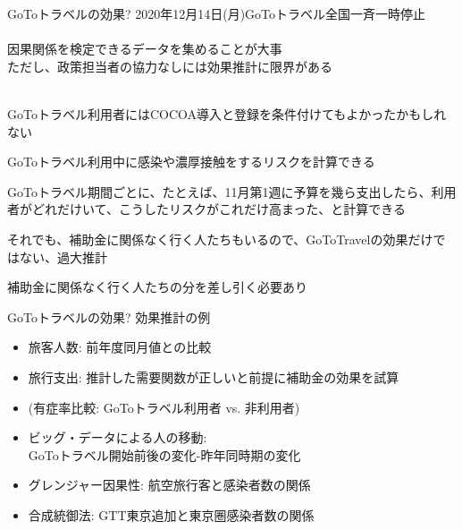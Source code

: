 \begin{frame}[t]{GoToトラベルの効果?}
2020年12月14日(月)GoToトラベル全国一斉一時停止\\~\\
因果関係を検定できるデータを集めることが大事\\
\pause
ただし、政策担当者の協力なしには効果推計に限界がある\\~\\
\pause
\begin{dinglist}{43}
\vspace{1.0ex}\setlength{\itemsep}{1.0ex}\setlength{\baselineskip}{12pt}
\item	GoToトラベル利用者にはCOCOA導入と登録を条件付けてもよかったかもしれない
\item	GoToトラベル利用中に感染や濃厚接触をするリスクを計算できる
\item	GoToトラベル期間ごとに、たとえば、11月第1週に予算を幾ら支出したら、利用者がどれだけいて、こうしたリスクがこれだけ高まった、と計算できる
	\begin{dinglist}{45}
	\vspace{1.0ex}\setlength{\itemsep}{1.0ex}\setlength{\baselineskip}{12pt}
	\item	それでも、補助金に関係なく行く人たちもいるので、GoToTravelの効果だけではない、過大推計
	\item	補助金に関係なく行く人たちの分を差し引く必要あり
	\end{dinglist}
\end{dinglist}
\end{frame}

\begin{frame}[t]{GoToトラベルの効果?}
効果推計の例
\begin{itemize}
\vspace{1.0ex}\setlength{\itemsep}{2.0ex}\setlength{\baselineskip}{12pt}
\item	旅客人数: 前年度同月値との比較
\item	旅行支出: 推計した需要関数が正しいと前提に補助金の効果を試算
\item	(有症率比較: GoToトラベル利用者 vs. 非利用者)
\item	ビッグ・データによる人の移動: \\
\hspace{1em}GoToトラベル開始前後の変化-昨年同時期の変化
\item	グレンジャー因果性: 航空旅行客と感染者数の関係
\item	合成統御法: GTT東京追加と東京圏感染者数の関係
\end{itemize}
\end{frame}

